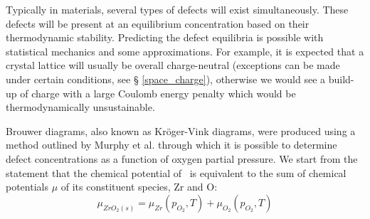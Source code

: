Typically in materials, several types of defects will exist simultaneously. These defects will be present at an equilibrium concentration based on their thermodynamic stability. Predicting the defect equilibria is possible with statistical mechanics and some approximations. For example, it is expected that a crystal lattice will usually be overall charge-neutral (exceptions can be made under certain conditions, see § \ref{space_charge}), otherwise we would see a build-up of charge with a large Coulomb energy penalty which would be thermodynamically unsustainable.

Brouwer diagrams, also known as Kr{\"o}ger-Vink diagrams, were produced using a method outlined by Murphy et al. \cite{Murphy2014, Murphy2014a} through which it is possible to determine defect concentrations as a function of oxygen partial pressure. We start from the statement that the chemical potential of \zirconia\ is equivalent to the sum of chemical potentials $\mu$ of its constituent species, Zr and O:
\begin{equation}
{\mu}_{ZrO_2(s)} = {\mu}_{Zr}(p_{O_2}, T) + {\mu}_{O_{2}}(p_{O_{2}}, T)
\label{mewZrO2compmethodology}
\end{equation}

